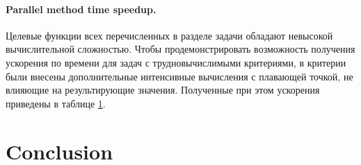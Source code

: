 \documentclass{llncs}
\begin{document}
\paragraph{Parallel method time speedup.} Целевые функции всех перечисленных в разделе задачи обладают невысокой вычислительной сложностью. Чтобы продемонстрировать возможность получения ускорения по времени для задач с трудновычислимыми критериями, в критерии были внесены дополнительные интенсивные вычисления с плавающей точкой, не влияющие на результирующие значения. Полученные при этом ускорения приведены в таблице \ref{}.

\section{Conclusion}

%
%
%
%

%


\clearpage
{} %
\renewcommand{\indexname}{Author Index}
\printindex
\clearpage
\end{document}
